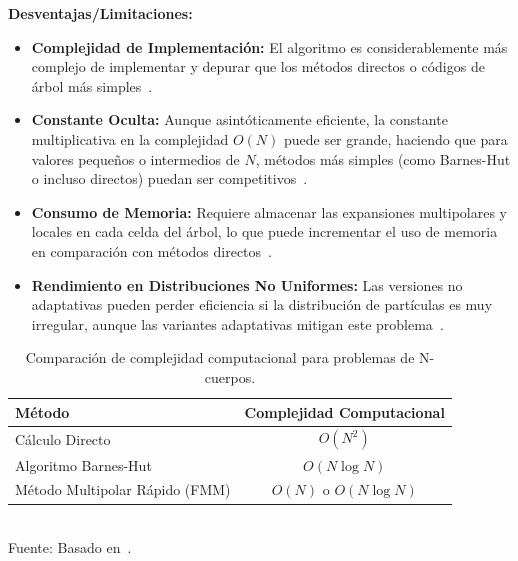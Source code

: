\textbf{Desventajas/Limitaciones:}
\begin{itemize}
    \item \textbf{Complejidad de Implementación:} El algoritmo es considerablemente más complejo de implementar y depurar que los métodos directos o códigos de árbol más simples~\cite{BeatsonGreengard1997, Martinsson2012}.
    \item \textbf{Constante Oculta:} Aunque asintóticamente eficiente, la constante multiplicativa en la complejidad $O(N)$ puede ser grande, haciendo que para valores pequeños o intermedios de $N$, métodos más simples (como Barnes-Hut o incluso directos) puedan ser competitivos~\cite{Dehnen2002}.
    \item \textbf{Consumo de Memoria:} Requiere almacenar las expansiones multipolares y locales en cada celda del árbol, lo que puede incrementar el uso de memoria en comparación con métodos directos~\cite{YingEtAl2004}.
    \item \textbf{Rendimiento en Distribuciones No Uniformes:} Las versiones no adaptativas pueden perder eficiencia si la distribución de partículas es muy irregular, aunque las variantes adaptativas mitigan este problema~\cite{CarrierEtAl1988, ChengEtAl1999}.
\end{itemize}

\begin{table}[H]
    \centering
    \caption{Comparación de complejidad computacional para problemas de N-cuerpos.}%
    \label{tab:fmm_complexity}
    \begin{tabular}{lc}
        \hline
        \textbf{Método} & \textbf{Complejidad Computacional} \\
        \hline
        Cálculo Directo & $O(N^2)$ \\
        Algoritmo Barnes-Hut & $O(N \log N)$ \\
        Método Multipolar Rápido (FMM) & $O(N)$ o $O(N \log N)$ \\
        \hline
    \end{tabular}\\
    \medskip \small Fuente: Basado en~\cite{GreengardRokhlin1987, BeatsonGreengard1997, Martinsson2012}.
\end{table}
